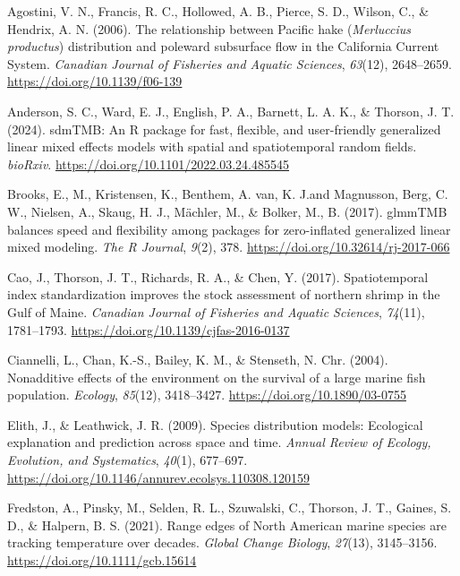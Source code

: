 \documentclass[
]{article}
\newlength{\cslhangindent}
\newenvironment{CSLReferences}[2] %
 {\begin{list}{}{%
  \setlength{\itemindent}{0pt}
  \setlength{\leftmargin}{0pt}
  \setlength{\parsep}{0pt}
  \ifodd #1
   \setlength{\leftmargin}{\cslhangindent}
   \setlength{\itemindent}{-1\cslhangindent}
  \fi
  \setlength{\itemsep}{#2\baselineskip}}}
 {\end{list}}
\begin{document}
\label{refs}
\begin{CSLReferences}{1}{0}
Agostini, V. N., Francis, R. C., Hollowed, A. B., Pierce, S. D., Wilson,
C., \& Hendrix, A. N. (2006). {The relationship between Pacific hake
({\emph{Merluccius productus}}) distribution and poleward subsurface
flow in the California Current System}. \emph{Canadian Journal of
Fisheries and Aquatic Sciences}, \emph{63}(12), 2648--2659.
\url{https://doi.org/10.1139/f06-139}

Anderson, S. C., Ward, E. J., English, P. A., Barnett, L. A. K., \&
Thorson, J. T. (2024). {sdmTMB: An R package for fast, flexible, and
user-friendly generalized linear mixed effects models with spatial and
spatiotemporal random fields}. \emph{bioRxiv}.
\url{https://doi.org/10.1101/2022.03.24.485545}

Brooks, E., M., Kristensen, K., Benthem, A. van, K. J.and Magnusson,
Berg, C. W., Nielsen, A., Skaug, H. J., Mächler, M., \& Bolker, M., B.
(2017). {glmmTMB balances speed and flexibility among packages for
zero-inflated generalized linear mixed modeling}. \emph{The R Journal},
\emph{9}(2), 378. \url{https://doi.org/10.32614/rj-2017-066}

Cao, J., Thorson, J. T., Richards, R. A., \& Chen, Y. (2017).
{Spatiotemporal index standardization improves the stock assessment of
northern shrimp in the Gulf of Maine}. \emph{Canadian Journal of
Fisheries and Aquatic Sciences}, \emph{74}(11), 1781--1793.
\url{https://doi.org/10.1139/cjfas-2016-0137}

Ciannelli, L., Chan, K.-S., Bailey, K. M., \& Stenseth, N. Chr. (2004).
{Nonadditive effects of the environment on the survival of a large
marine fish population}. \emph{Ecology}, \emph{85}(12), 3418--3427.
\url{https://doi.org/10.1890/03-0755}

Elith, J., \& Leathwick, J. R. (2009). {Species distribution models:
Ecological explanation and prediction across space and time}.
\emph{Annual Review of Ecology, Evolution, and Systematics},
\emph{40}(1), 677--697.
\url{https://doi.org/10.1146/annurev.ecolsys.110308.120159}

Fredston, A., Pinsky, M., Selden, R. L., Szuwalski, C., Thorson, J. T.,
Gaines, S. D., \& Halpern, B. S. (2021). {Range edges of North American
marine species are tracking temperature over decades}. \emph{Global
Change Biology}, \emph{27}(13), 3145--3156.
\url{https://doi.org/10.1111/gcb.15614}


\end{CSLReferences}
\end{document}
